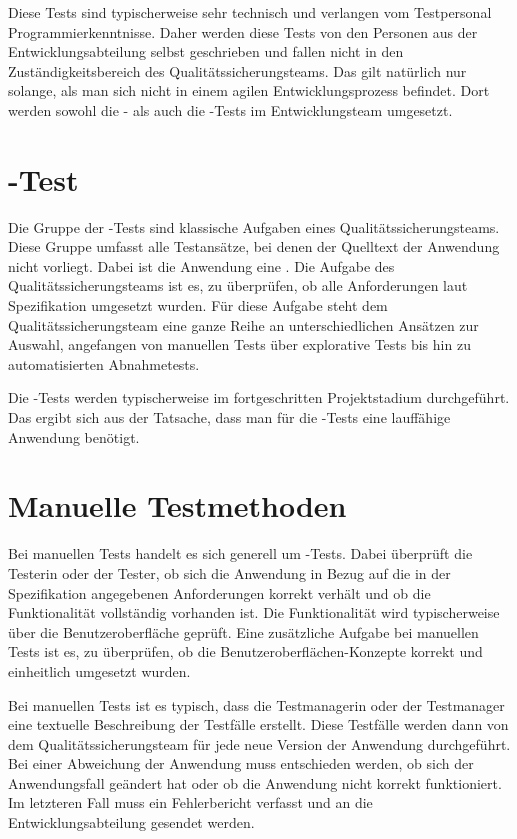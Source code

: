 \SuperPar
Diese Tests sind typischerweise sehr technisch und verlangen vom Testpersonal Programmierkenntnisse. Daher werden diese Tests von den Personen aus der Entwicklungsabteilung selbst geschrieben und fallen nicht in den Zuständigkeitsbereich des Qualitätssicherungsteams. Das gilt natürlich nur solange, als man sich nicht in einem agilen Entwicklungsprozess befindet. Dort werden sowohl die - als auch die -Tests im Entwicklungsteam umgesetzt.


\section{-Test}

Die Gruppe der -Tests sind klassische Aufgaben eines Qualitätssicherungsteams. Diese Gruppe umfasst alle Testansätze, bei denen der Quelltext der Anwendung nicht vorliegt. Dabei ist die Anwendung eine . Die Aufgabe des Qualitätssicherungsteams ist es, zu überprüfen, ob alle Anforderungen laut Spezifikation umgesetzt wurden. Für diese Aufgabe steht dem Qualitätssicherungsteam eine ganze Reihe an unterschiedlichen Ansätzen zur Auswahl, angefangen von manuellen Tests über explorative Tests bis hin zu automatisierten Abnahmetests. 

\SuperPar
Die -Tests werden typischerweise im fortgeschritten Projektstadium durchgeführt. Das ergibt sich aus der Tatsache, dass man für die -Tests eine lauffähige Anwendung benötigt.

\section{Manuelle Testmethoden}

Bei manuellen Tests handelt es sich generell um -Tests. Dabei überprüft die Testerin oder der Tester, ob sich die Anwendung in Bezug auf die in der Spezifikation angegebenen Anforderungen korrekt verhält und ob die Funktionalität vollständig vorhanden ist. Die Funktionalität wird typischerweise über die Benutzeroberfläche geprüft. Eine zusätzliche Aufgabe bei manuellen Tests ist es, zu überprüfen, ob die Benutzeroberflächen-Konzepte korrekt und einheitlich umgesetzt wurden.

\SuperPar
Bei manuellen Tests ist es typisch, dass die Testmanagerin oder der Testmanager eine textuelle Beschreibung der Testfälle erstellt. Diese Testfälle werden dann von dem Qualitätssicherungsteam für jede neue Version der Anwendung durchgeführt. Bei einer Abweichung der Anwendung muss entschieden werden, ob sich der Anwendungsfall geändert hat oder ob die Anwendung nicht korrekt funktioniert. Im letzteren Fall muss ein Fehlerbericht verfasst und an die Entwicklungsabteilung gesendet werden.

